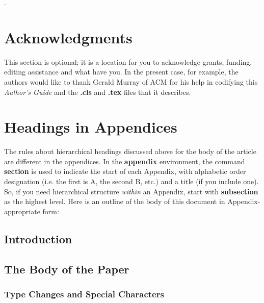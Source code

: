 \documentclass{sig-alternate-br}
\begin{document}
\vspace{70 mm}
.
\vspace{10 mm}

\section{Acknowledgments}
This section is optional; it is a location for you to acknowledge
grants, funding, editing assistance and what have you.  In the
present case, for example, the authors would like to thank Gerald
Murray of ACM for his help in codifying this \textit{Author's
Guide} and the \textbf{.cls} and \textbf{.tex} files that it
describes.

%


%
%
\vspace{50 mm}
\newpage

\appendix
\section{Headings in Appendices}
The rules about hierarchical headings discussed above for the body
of the article are different in the appendices. In the
\textbf{appendix} environment, the command \textbf{section} is
used to indicate the start of each Appendix, with alphabetic order
designation (i.e. the first is A, the second B, etc.) and a title
(if you include one).  So, if you need hierarchical structure
\textit{within} an Appendix, start with \textbf{subsection} as the
highest level. Here is an outline of the body of this document in
Appendix-appropriate form:
\subsection{Introduction}
\subsection{The Body of the Paper}
\subsubsection{Type Changes and  Special Characters}
\end{document}
